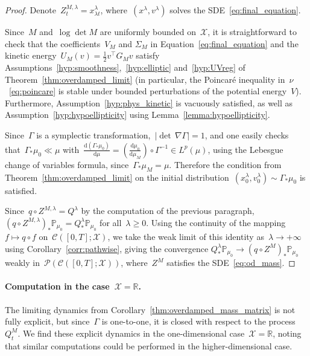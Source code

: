 \documentclass[10pt]{article}
\renewcommand{\d}{\mathrm{d}}
\renewcommand{\P}{\mathbb{P}}
\newcommand{\R}{\mathbb{R}}
\newcommand{\cX}{\mathcal{X}}
\newcommand{\cP}{\mathcal{P}}
\newcommand{\1}{\mathbbm 1}
\begin{document}
\begin{proof}
Denote~$Z^{M,\lambda}_t = x_{\lambda t}^\lambda$, where~$(x^\lambda,v^\lambda)$ solves the SDE~\eqref{eq:final_equation}.

Since~$M$ and~$\log\det M$ are uniformly bounded on~$\cX$, it is straightforward to check that the coefficients~$V_M$ and $\Sigma_M$ in Equation~\eqref{eq:final_equation} and the kinetic energy~$U_M(v)=\frac12v^\top G_M v$ satisfy Assumptions~\ref{hyp:smoothness},~\ref{hyp:elliptic} and~\ref{hyp:UVreg} of Theorem~\ref{thm:overdamped_limit} (in particular, the Poincaré inequality in~$\nu$~\eqref{eq:poincare} is stable under bounded perturbations of the potential energy~$V$).
Furthermore, Assumption~\eqref{hyp:phys_kinetic} is vacuously satisfied, as well as Assumption~\ref{hyp:hypoellipticity} using Lemma~\ref{lemma:hypoellipticity}.

Since~$\Gamma$ is a symplectic transformation,~$|\det\,\nabla \Gamma|=1$, and one easily checks that~$\Gamma_*\mu_0 \ll \mu$ with~${\frac{\d(\Gamma_*\mu_0)}{\d\mu} = \left(\frac{\d\mu_0}{\d\mu_M}\right)\circ \Gamma^{-1}\in L^p(\mu)}$, using the Lebesgue change of variables formula, since~$\Gamma_*\mu_M=\mu$. Therefore the condition from Theorem~\ref{thm:overdamped_limit} on the initial distribution~$(x_0^\lambda,v_0^\lambda)\sim \Gamma_*\mu_0$ is satisfied.

Since~$q\circ Z^{M,\lambda}=Q^\lambda$ by the computation of the previous paragraph,~$(q\circ Z^{M,\lambda})_*\P_{\mu_0} = Q^\lambda_*\P_{\mu_0}$ for all~$\lambda\geq 0$. Using the continuity of the mapping~$f\mapsto q\circ f$ on~$\mathcal C([0,T];\cX)$, we take the weak limit of this identity as~$\lambda\to +\infty$ using Corollary~\ref{corr:pathwise}, giving the convergence
$Q^\lambda_*\P_{\mu_0}\to (q\circ Z^M)_*\P_{\mu_0}$ weakly in~$\cP(\mathcal C([0,T];\cX))$, where~$Z^M$ satisfies the SDE~\eqref{eq:od_mass}.
\end{proof}

\paragraph{Computation in the case~$\cX=\R$.}
The limiting dynamics from Corollary~\ref{thm:overdamped_mass_matrix} is not fully explicit, but since~$\Gamma$ is one-to-one, it is closed with respect to the process~$Q_t^M$. 
We find these explicit dynamics in the one-dimensional case~$\cX=\R$, noting that similar computations could be performed in the higher-dimensional case.
\end{document}
